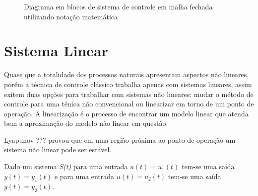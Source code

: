 \begin{figure}[!htb]
\centering
{}
\caption{ Diagrama em blocos de sistema de controle em malha fechada utilizando notação matemática}
\label{fig:malhaFechadaLetras}
\end{figure}



\section{Sistema Linear}


Quase que a totalidade dos processos naturais apresentam aspectos não lineares, porém a técnica de controle clássico trabalha apenas com sistemas lineares, assim exitem duas opções para trabalhar com sistemas não lineares: mudar o método de controle para uma ténica não convencional ou linearizar em torno de um ponto de operação. A linearização é o processo de encontrar um modelo linear que atenda bem a aproximação do modelo não linear em questão.

Lyapunov ??? provou que em uma região próxima ao ponto de operação um sistema não linear pode ser estável.

Dado um sistema \emph{S(t)} para uma entrada $u(t) = u_1(t)$ tem-se uma saída $y(t) = y_1(t)$ e para uma entrada $u(t) = u_2(t)$ tem-se uma saída $y(t) = y_2(t)$.


